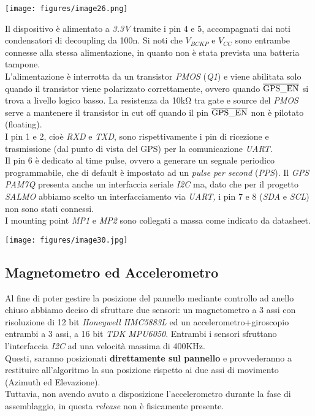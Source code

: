 \begin{center}
\texttt{[image: figures/image26.png]}
\captionsetup{type=figure}
\end{center}

\noindent Il dispositivo è alimentato a \emph{3.3V} tramite i pin 4 e 5,
accompagnati dai noti condensatori di decoupling da 100n.
Si noti che $V_{BCKP}$ e $V_{CC}$ sono entrambe connesse alla stessa
alimentazione, in quanto non è stata prevista una batteria tampone. \\
L'alimentazione è interrotta da un transistor \emph{PMOS} (\emph{Q1}) e
viene abilitata solo quando il transistor viene polarizzato
correttamente, ovvero quando $\overline{\rm {GPS\_{EN}}}$ si trova a
livello logico basso. La resistenza da 10kΩ tra gate e source del \textit{PMOS}
serve a mantenere il transistor in cut off quando il pin
$\overline{\rm {GPS\_{EN}}}$ non è pilotato (floating).\\
I pin 1 e 2, cioè \emph{RXD} e \emph{TXD}, sono rispettivamente i pin di
ricezione e trasmissione (dal punto di vista del GPS) per la comunicazione \emph{UART}.\\
Il pin 6 è dedicato al time pulse, ovvero a generare un segnale
periodico programmabile, che di default è impostato ad un \textit{pulse per second} (\textit{PPS}). Il \emph{GPS}
\emph{PAM7Q} presenta anche un interfaccia seriale \emph{I2C} ma, dato
che per il progetto \emph{SALMO} abbiamo scelto un interfacciamento via
\emph{UART,} i pin 7 e 8 (\emph{SDA} e \emph{SCL}) non sono stati connessi.\\
I mounting point \emph{MP1} e \emph{MP2} sono collegati a massa come
indicato da datasheet.

\begin{center}
\texttt{[image: figures/image30.jpg]}
\captionsetup{type=figure}
\end{center}

\hypertarget{magnetometro-ed-accelerometro}{%
\subsection{\texorpdfstring{Magnetometro ed Accelerometro}{Magnetometro ed Accelerometro}}\label{magnetometro-ed-accelerometro}}

Al fine di poter gestire la posizione del pannello mediante controllo ad
anello chiuso abbiamo deciso di sfruttare due sensori: un magnetometro a
3 assi con risoluzione di 12 bit \emph{Honeywell} \emph{HMC5883L} ed un
accelerometro+giroscopio entrambi a 3 assi, a 16 bit \emph{TDK}
\emph{MPU6050}. Entrambi i sensori sfruttano l'interfaccia \emph{I2C} 
ad una velocità massima di 400KHz.\\
Questi, saranno posizionati \textbf{direttamente sul pannello} e
provvederanno a restituire all'algoritmo la sua posizione
rispetto ai due assi di movimento (Azimuth ed Elevazione).\\
Tuttavia, non avendo avuto a disposizione l'accelerometro durante la
fase di assemblaggio, in questa \textit{release} non è fisicamente presente.

